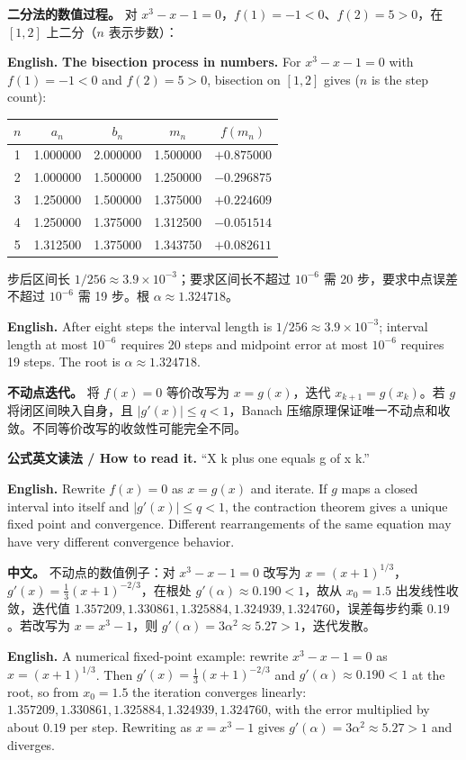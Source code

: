 \documentclass[UTF8,11pt,a4paper]{ctexart}
\newcommand{\EN}[1]{\par\noindent\textbf{English.} #1\par}
\newcommand{\READ}[1]{\par\noindent\textbf{公式英文读法 / How to read it.} #1\par}
\newcommand{\APS}[2]{\par\noindent\textbf{中文。} #1\par\noindent\textbf{English.} #2\par\smallskip}
\begin{document}
\noindent\textbf{二分法的数值过程。} 对 $x^3-x-1=0$，$f(1)=-1<0$、$f(2)=5>0$，在 $[1,2]$ 上二分（$n$ 表示步数）：
\EN{\textbf{The bisection process in numbers.} For $x^3-x-1=0$ with $f(1)=-1<0$ and $f(2)=5>0$, bisection on $[1,2]$ gives ($n$ is the step count):}
\begin{center}\footnotesize
\begin{tabular}{c c c c c}
\hline
$n$ & $a_n$ & $b_n$ & $m_n$ & $f(m_n)$\\
\hline
1 & 1.000000 & 2.000000 & 1.500000 & $+0.875000$\\
2 & 1.000000 & 1.500000 & 1.250000 & $-0.296875$\\
3 & 1.250000 & 1.500000 & 1.375000 & $+0.224609$\\
4 & 1.250000 & 1.375000 & 1.312500 & $-0.051514$\\
5 & 1.312500 & 1.375000 & 1.343750 & $+0.082611$\\
\hline
\end{tabular}
\end{center}
 步后区间长 $1/256\approx3.9\times10^{-3}$；要求区间长不超过 $10^{-6}$ 需 20 步，要求中点误差不超过 $10^{-6}$ 需 19 步。根 $\alpha\approx1.324718$。
\EN{After eight steps the interval length is $1/256\approx3.9\times10^{-3}$; interval length at most $10^{-6}$ requires 20 steps and midpoint error at most $10^{-6}$ requires 19 steps. The root is $\alpha\approx1.324718$.}

\noindent\textbf{不动点迭代。} 将 $f(x)=0$ 等价改写为 $x=g(x)$，迭代 $x_{k+1}=g(x_k)$。若 $g$ 将闭区间映入自身，且 $|g'(x)|\le q<1$，Banach 压缩原理保证唯一不动点和收敛。不同等价改写的收敛性可能完全不同。
\READ{“X k plus one equals g of x k.”}
\EN{Rewrite $f(x)=0$ as $x=g(x)$ and iterate. If $g$ maps a closed interval into itself and $|g'(x)|\le q<1$, the contraction theorem gives a unique fixed point and convergence. Different rearrangements of the same equation may have very different convergence behavior.}
\APS{不动点的数值例子：对 $x^3-x-1=0$ 改写为 $x=(x+1)^{1/3}$，$g'(x)=\tfrac13(x+1)^{-2/3}$，在根处 $g'(\alpha)\approx0.190<1$，故从 $x_0=1.5$ 出发线性收敛，迭代值 $1.357209,1.330861,1.325884,1.324939,1.324760$，误差每步约乘 $0.19$。若改写为 $x=x^3-1$，则 $g'(\alpha)=3\alpha^2\approx5.27>1$，迭代发散。}{A numerical fixed-point example: rewrite $x^3-x-1=0$ as $x=(x+1)^{1/3}$. Then $g'(x)=\tfrac13(x+1)^{-2/3}$ and $g'(\alpha)\approx0.190<1$ at the root, so from $x_0=1.5$ the iteration converges linearly: $1.357209,1.330861,1.325884,1.324939,1.324760$, with the error multiplied by about $0.19$ per step. Rewriting as $x=x^3-1$ gives $g'(\alpha)=3\alpha^2\approx5.27>1$ and diverges.}
\end{document}
